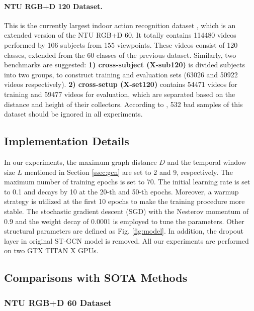 \documentclass[sigconf]{acmart}
\begin{document}
\paragraph{NTU RGB+D 120 Dataset.} This is the currently largest indoor action recognition dataset \cite{liu2019ntu}, which is an extended version of the NTU RGB+D 60. It totally contains 114480 videos performed by 106 subjects from 155 viewpoints. These videos consist of 120 classes, extended from the 60 classes of the previous dataset. Similarly, two benchmarks are suggested: {\bf 1) cross-subject (X-sub120)} is divided subjects into two groups, to construct training and evaluation sets (63026 and 50922 videos respectively). {\bf 2) cross-setup (X-set120)} contains 54471 videos for training and 59477 videos for evaluation, which are separated based on the distance and height of their collectors. According to \cite{liu2019ntu}, 532 bad samples of this dataset should be ignored in all experiments.

\subsection{Implementation Details}
\label{ssec:Implementation}

In our experiments, the maximum graph distance $D$ and the temporal window size $L$ mentioned in Section \ref{ssec:gcn} are set to 2 and 9, respectively. The maximum number of training epochs is set to 70. The initial learning rate is set to 0.1 and decays by 10 at the 20-th and 50-th epochs. Moreover, a warmup strategy \cite{he2016deep} is utilized at the first 10 epochs to make the training procedure more stable. The stochastic gradient descent (SGD) with the Nesterov momentum of 0.9 and the weight decay of 0.0001 is employed to tune the parameters. Other structural parameters are defined as Fig. \ref{fig:model}. In addition, the dropout layer in original ST-GCN model \cite{yan2018spatial} is removed. All our experiments are performed on two GTX TITAN X GPUs.

\subsection{Comparisons with SOTA Methods}
\label{ssec:comparisons}

\subsubsection{NTU RGB+D 60 Dataset}
\label{sssec:ntu60}
\end{document}
